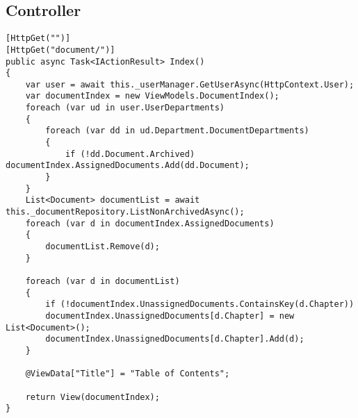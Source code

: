 \subsection{Controller}

\begin{lstlisting}
[HttpGet("")]
[HttpGet("document/")]
public async Task<IActionResult> Index()
{
	var user = await this._userManager.GetUserAsync(HttpContext.User);
	var documentIndex = new ViewModels.DocumentIndex();
	foreach (var ud in user.UserDepartments)
	{
		foreach (var dd in ud.Department.DocumentDepartments)
		{
			if (!dd.Document.Archived) documentIndex.AssignedDocuments.Add(dd.Document);
		}
	}
	List<Document> documentList = await this._documentRepository.ListNonArchivedAsync();
	foreach (var d in documentIndex.AssignedDocuments)
	{
		documentList.Remove(d);
	}

	foreach (var d in documentList)
	{
		if (!documentIndex.UnassignedDocuments.ContainsKey(d.Chapter))
		documentIndex.UnassignedDocuments[d.Chapter] = new List<Document>();
		documentIndex.UnassignedDocuments[d.Chapter].Add(d);
	}

	@ViewData["Title"] = "Table of Contents";

	return View(documentIndex);
}




\end{lstlisting}

